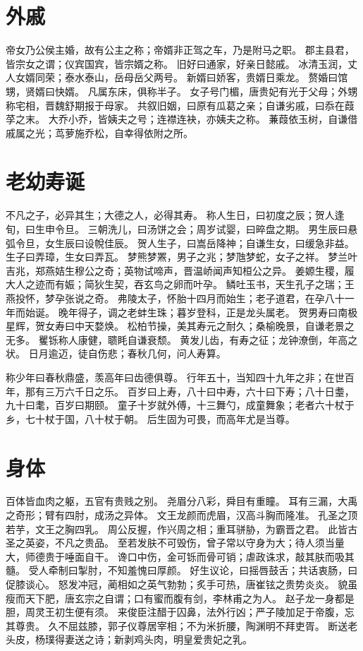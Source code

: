 \documentclass[12pt,UTF8]{ctexbook}
\begin{document}
\chapter{外戚}

帝女乃公侯主婚，故有公主之称；帝婿非正驾之车，乃是附马之职。
郡主县君，皆宗女之谓；仪宾国宾，皆宗婿之称。
旧好曰通家，好亲日懿戚。
冰清玉润，丈人女婿同荣；泰水泰山，岳母岳父两号。
新婿曰娇客，贵婿日乘龙。
赘婚曰馆甥，贤婿曰快婿。
凡属东床，俱称半子。
女子号门楣，唐贵妃有光于父母；外甥称宅相，晋魏舒期报于母家。
共叙旧姻，曰原有瓜葛之亲；自谦劣戚，曰忝在葭莩之末。
大乔小乔，皆姨夫之号；连襟连袂，亦姨夫之称。
蒹葭依玉树，自谦借戚属之光；茑萝施乔松，自幸得依附之所。

\chapter{老幼寿诞}

不凡之子，必异其生；大德之人，必得其寿。
称人生日，曰初度之辰；贺人逢旬，曰生申令旦。
三朝洗儿，曰汤饼之会；周岁试婴，曰晬盘之期。
男生辰曰悬弧令旦，女生辰曰设帨佳辰。
贺人生子，曰嵩岳降神；自谦生女，曰缓急非益。
生子曰弄璋，生女曰弄瓦。
梦熊梦罴，男子之兆；梦虺梦蛇，女子之祥。
梦兰叶吉兆，郑燕姞生穆公之奇；英物试啼声，晋温峤闻声知桓公之异。
姜嫄生稷，履大人之迹而有娠；简狄生契，吞玄鸟之卵而叶孕。
鳞吐玉书，天生孔子之瑞；王燕投怀，梦孕张说之奇。
弗陵太子，怀胎十四月而始生；老子道君，在孕八十一年而始诞。
晚年得子，调之老蚌生珠；暮岁登科，正是龙头属老。
贺男寿曰南极星辉，贺女寿曰中天婺焕。
松柏节操，美其寿元之耐久；桑榆晚景，自谦老景之无多。
矍铄称人康健，聩眊自谦衰颓。
黄发儿齿，有寿之征；龙钟潦倒，年高之状。
日月逾迈，徒自伤悲；春秋几何，问人寿算。

称少年曰春秋鼎盛，羡高年曰齿德俱尊。
行年五十，当知四十九年之非；在世百年，那有三万六千日之乐。
百岁曰上寿，八十曰中寿，六十曰下寿；八十日耋，九十曰耄，百岁曰期颐。
童子十岁就外傅，十三舞勺，成童舞象；老者六十杖于乡，七十杖于国，八十杖于朝。
后生固为可畏，而高年尤是当尊。

\chapter{身体}

百体皆血肉之躯，五官有贵贱之别。
	尧眉分八彩，舜目有重瞳。
	耳有三漏，大禹之奇形；臂有四肘，成汤之异体。
	文王龙颜而虎眉，汉高斗胸而隆准。
	孔圣之顶若芋，文王之胸四乳。
	周公反握，作兴周之相；重耳骈胁，为霸晋之君。
	此皆古圣之英姿，不凡之贵品。
	至若发肤不可毁伤，曾子常以守身为大；待人须当量大，师德贵于唾面自干。
	谗口中伤，金可铄而骨可销；虐政诛求，敲其肤而吸其髓。
	受人牵制曰掣肘，不知羞愧曰厚颜。
	好生议论，曰摇唇鼓舌；共话衷肠，曰促膝谈心。
	怒发冲冠，蔺相如之英气勃勃；炙手可热，唐崔铉之贵势炎炎。
	貌虽瘦而天下肥，唐玄宗之自谓；口有蜜而腹有剑，李林甫之为人。
	赵子龙一身都是胆，周灵王初生便有须。
	来俊臣注醋于囚鼻，法外行凶；严子陵加足于帝腹，忘其尊贵。
	久不屈兹膝，郭子仪尊居宰相；不为米折腰，陶渊明不拜吏胥。
	断送老头皮，杨璞得妻送之诗；新剥鸡头肉，明皇爱贵妃之乳。
\end{document}
